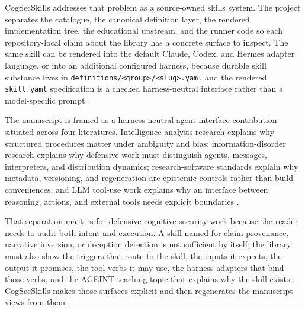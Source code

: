 \documentclass[
]{article}
\begin{document}
CogSecSkills addresses that problem as a source-owned skills system. The
project separates the catalogue, the canonical definition layer, the
rendered implementation tree, the educational upstream, and the runner
code so each repository-local claim about the library has a concrete
surface to inspect. The same skill can be rendered into the default
Claude, Codex, and Hermes adapter language, or into an additional
configured harness, because durable skill substance lives in
\texttt{definitions/\textless{}group\textgreater{}/\textless{}slug\textgreater{}.yaml}
and the rendered \texttt{skill.yaml} specification is a checked
harness-neutral interface rather than a model-specific prompt.

The manuscript is framed as a harness-neutral agent-interface
contribution situated across four literatures. Intelligence-analysis
research explains why structured procedures matter under ambiguity and
bias; information-disorder research explains why defensive work must
distinguish agents, messages, interpreters, and distribution dynamics;
research-software standards explain why metadata, versioning, and
regeneration are epistemic controls rather than build conveniences; and
LLM tool-use work explains why an interface between reasoning, actions,
and external tools needs explicit boundaries
\citep{heuer1999psychology, wardleDerakhshan2017informationDisorder, wilkinson2016fair, smith2016softwareCitation, yao2022react, schick2023toolformer}.

That separation matters for defensive cognitive-security work because
the reader needs to audit both intent and execution. A skill named for
claim provenance, narrative inversion, or deception detection is not
sufficient by itself; the library must also show the triggers that route
to the skill, the inputs it expects, the output it promises, the tool
verbs it may use, the harness adapters that bind those verbs, and the
AGEINT teaching topic that explains why the skill exists
\citep{ageint2026}. CogSecSkills makes those surfaces explicit and then
regenerates the manuscript views from them.
\end{document}
